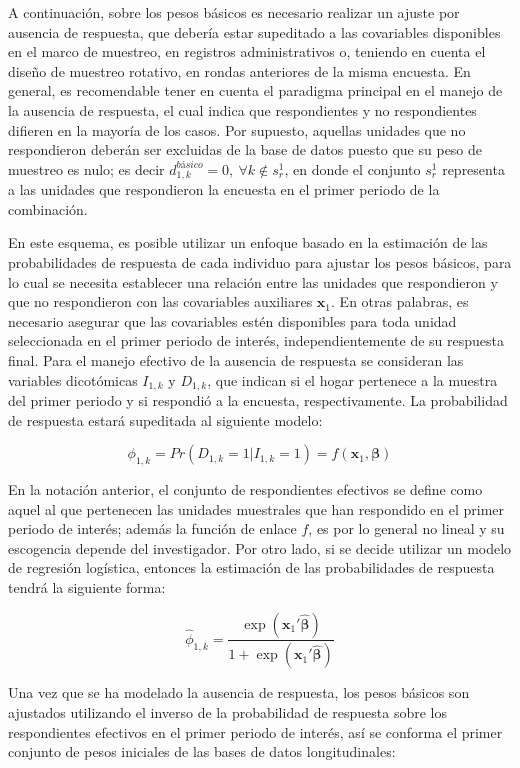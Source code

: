 \documentclass[
  10pt,
  spanish,
]{book}
\begin{document}
A continuación, sobre los pesos básicos es necesario realizar un ajuste por ausencia de respuesta, que debería estar supeditado a las covariables disponibles en el marco de muestreo, en registros administrativos o, teniendo en cuenta el diseño de muestreo rotativo, en rondas anteriores de la misma encuesta. En general, es recomendable tener en cuenta el paradigma principal en el manejo de la ausencia de respuesta, el cual indica que respondientes y no respondientes difieren en la mayoría de los casos. Por supuesto, aquellas unidades que no respondieron deberán ser excluidas de la base de datos puesto que su peso de muestreo es nulo; es decir \(d_{1, k}^{básico} = 0, \ \forall k \notin s_r^1\), en donde el conjunto \(s_r^1\) representa a las unidades que respondieron la encuesta en el primer periodo de la combinación.

En este esquema, es posible utilizar un enfoque basado en la estimación de las probabilidades de respuesta de cada individuo para ajustar los pesos básicos, para lo cual se necesita establecer una relación entre las unidades que respondieron y que no respondieron con las covariables auxiliares \(\mathbf{x}_{1}\). En otras palabras, es necesario asegurar que las covariables estén disponibles para toda unidad seleccionada en el primer periodo de interés, independientemente de su respuesta final. Para el manejo efectivo de la ausencia de respuesta se consideran las variables dicotómicas \(I_{1, k}\) y \(D_{1, k}\), que indican si el hogar pertenece a la muestra del primer periodo y si respondió a la encuesta, respectivamente. La probabilidad de respuesta estará supeditada al siguiente modelo:

\[
\phi_{1, k} = Pr(D_{1, k} = 1|I_{1, k} = 1) = f(\mathbf{x}_{1}, \boldsymbol\beta)
\]

En la notación anterior, el conjunto de respondientes efectivos se define como aquel al que pertenecen las unidades muestrales que han respondido en el primer periodo de interés; además la función de enlace \(f\), es por lo general no lineal y su escogencia depende del investigador. Por otro lado, si se decide utilizar un modelo de regresión logística, entonces la estimación de las probabilidades de respuesta tendrá la siguiente forma:

\[
\hat{\phi}_{1, k} = \frac{\exp{(\mathbf{x}_{1}' \hat{\boldsymbol\beta})}}{1 +\exp{(\mathbf{x}_{1}' \hat{\boldsymbol\beta})}}
\]

Una vez que se ha modelado la ausencia de respuesta, los pesos básicos son ajustados utilizando el inverso de la probabilidad de respuesta sobre los respondientes efectivos en el primer periodo de interés, así se conforma el primer conjunto de pesos iniciales de las bases de datos longitudinales:
\end{document}
